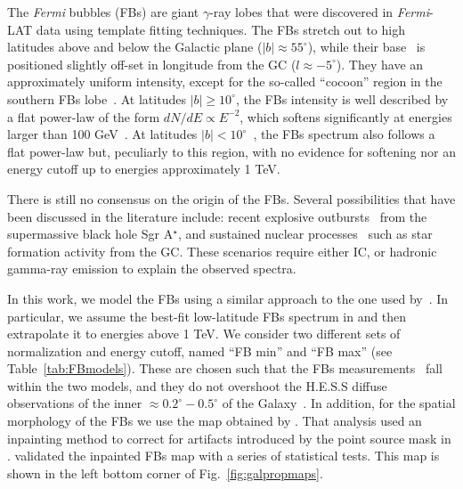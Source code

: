\documentclass[doublespace,draft,nopageskip]{VTthesis} %
\begin{document}
The \textit{Fermi} bubbles (FBs) are giant $\gamma$-ray lobes that were discovered in \textit{Fermi}-LAT data \citep{Su_etal:2010} using template fitting techniques. The FBs stretch out to high latitudes above and below the Galactic plane ($\lvert b \rvert \approx 55^\circ$), while their base~\citep{Herold:2019pei} is positioned slightly off-set in longitude from the GC ($l\approx-5^\circ$). 
They have an approximately uniform intensity, except for the so-called ``cocoon'' region in the southern FBs lobe~\citep{Su_etal:2012, Fermi-bubbles:2014sfa}. At latitudes $\lvert b
\rvert \geq 10^\circ$, the FBs intensity is well described by a flat power-law of the form $dN/dE\propto E^{-2}$, which  softens significantly at energies larger than 100 GeV~\citep{Fermi-bubbles:2014sfa}. At latitudes $\lvert b \rvert < 10^\circ$~\citep{Acero:2016qlg,TheFermi-LAT:2017vmf,Storm:2017arh,Herold:2019pei}, the FBs spectrum also follows a flat power-law but, peculiarly to this region, with no evidence for softening nor an energy cutoff up to energies approximately 1 TeV. 

There is still no consensus on the origin of the FBs. Several possibilities that have been discussed in the literature include: recent explosive outbursts~\citep{Su_etal:2010} from the supermassive black hole Sgr A$^\star$, and sustained nuclear processes~\citep{Crocker:2014fla} such as star formation activity from the GC. These scenarios require either IC, or hadronic gamma-ray emission to explain the observed spectra.

In this work, we model the FBs using a similar approach to the one used by~\cite{Rinchiuso:2020skh}. In particular, we assume the best-fit low-latitude FBs spectrum in \cite{TheFermi-LAT:2017vmf} and then extrapolate it to energies above 1 TeV. We consider two different sets of normalization and energy cutoff, named ``FB min'' and ``FB max'' (see Table~\ref{tab:FBmodels}). 
%
These are chosen such that the FBs measurements~\citep{TheFermi-LAT:2017vmf} fall within the two models, and they do not overshoot the H.E.S.S diffuse observations of the inner $\approx 0.2^\circ - 0.5^\circ$ of the Galaxy~\citep{Abramowski:2016mir}. In addition, for the spatial morphology of the FBs we use the map obtained by \citet{Macias:2019omb}. That analysis used an inpainting method to correct for artifacts introduced by the point source mask in \cite{TheFermi-LAT:2017vmf}. \cite{Macias:2019omb} validated the inpainted FBs map with a series of statistical tests. This map is shown in the left bottom corner of Fig.~\ref{fig:galpropmaps}.
\end{document}
